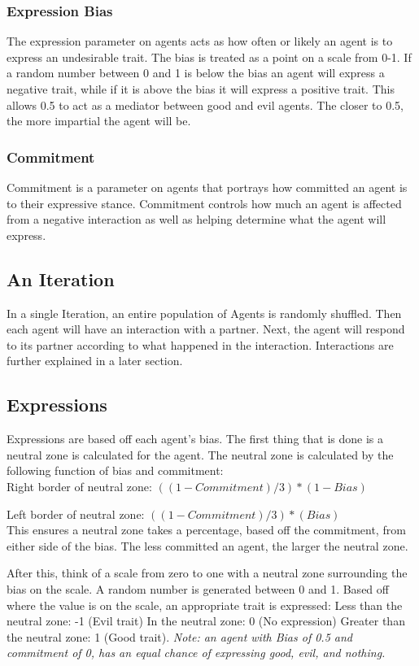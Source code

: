 \documentclass[]{article}
\begin{document}
\subsubsection{Expression Bias}
The expression parameter on agents acts as how often or likely an agent is to express an undesirable trait. The bias is treated as a point on a scale from 0-1. If a random number between 0 and 1 is below the bias an agent will express a negative trait, while if it is above the bias it will express a positive trait. This allows 0.5 to act as a mediator between good and evil agents. The closer to 0.5, the more impartial the agent will be. 

\subsubsection{Commitment}
Commitment is a parameter on agents that portrays how committed an agent is to their expressive stance. Commitment controls how much an agent is affected from a negative interaction as well as helping determine what the agent will express.

\subsection{An Iteration}
In a single Iteration, an entire population of Agents is randomly shuffled. Then each agent will have an interaction with a partner. Next, the agent will respond to its partner according to what happened in the interaction. Interactions are further explained in a later section.

\subsection{Expressions}
Expressions are based off each agent's bias. The first thing that is done is a neutral zone is calculated for the agent. The neutral zone is calculated by the following function of bias and commitment:
\\

	Right border of neutral zone: 
	$((1-Commitment)/3) * (1-Bias)$
	
	
	Left border of neutral zone: $
	((1-Commitment)/3) * (Bias)$\\


This ensures a neutral zone takes a percentage, based off the commitment, from either side of the bias. The less committed an agent, the larger the neutral zone.

After this, think of a scale from zero to one with a neutral zone surrounding the bias on the scale. A random number is generated between 0 and 1. Based off where the value is on the scale, an appropriate trait is expressed: Less than the neutral zone: -1 (Evil trait) In the neutral zone: 0 (No expression) Greater than the neutral zone: 1 (Good trait). \textit{Note: an agent with Bias of 0.5 and commitment of 0, has an equal chance of expressing good, evil, and nothing.}
\end{document}
